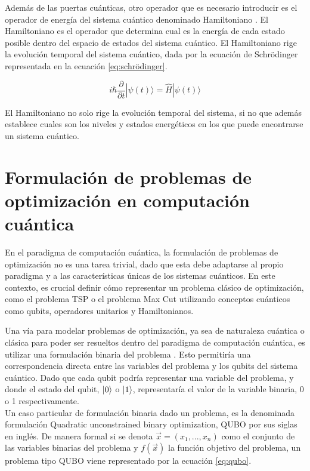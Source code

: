 Además de las puertas cuánticas, otro operador que es necesario introducir es el operador de energía del sistema cuántico denominado Hamiltoniano \citep{cohen}. El Hamiltoniano es el operador que determina cual es la energía de cada estado posible dentro del espacio de estados del sistema cuántico. El Hamiltoniano rige la evolución temporal del sistema cuántico, dada por la ecuación de Schrödinger representada en la ecuación \ref{eq:schrödinger}.

\begin{equation}
    i\hbar \frac{\partial}{\partial t} |\psi(t)\rangle = \hat{H} |\psi(t)\rangle
    \label{eq:schrödinger}
\end{equation}

El Hamiltoniano no solo rige la evolución temporal del sistema, si no que además establece cuales son los niveles y estados energéticos en los que puede encontrarse un sistema cuántico.

\section{Formulación de problemas de optimización en computación cuántica}

En el paradigma de computación cuántica, la formulación de problemas de optimización no es una tarea trivial, dado que esta debe adaptarse al propio paradigma y a las características únicas de los sistemas cuánticos. En este contexto, es crucial definir cómo representar un problema clásico de optimización, como el problema TSP o el problema Max Cut utilizando conceptos cuánticos como qubits, operadores unitarios y Hamiltonianos.

\newpage

Una vía para modelar problemas de optimización, ya sea de naturaleza cuántica o clásica para poder ser resueltos dentro del paradigma de computación cuántica, es utilizar una formulación binaria del problema \citep{lucas}. Esto permitiría una correspondencia directa entre las variables del problema y los qubits del sistema cuántico. Dado que cada qubit podría representar una variable del problema, y donde el estado del qubit, $\ket{0}$ o $\ket{1}$, representaría el valor de la variable binaria, 0 o 1 respectivamente. \\

Un caso particular de formulación binaria dado un problema, es la denominada formulación Quadratic unconstrained binary optimization, \mbox{QUBO} por sus siglas en inglés. De manera formal si se denota $\Vec{x} = (x_{1}, ..., x_{n})$ como el conjunto de las variables binarias del problema y $f(\Vec{x})$ la función objetivo del problema, un problema tipo \mbox{QUBO} viene representado por la ecuación \ref{eq:qubo}.

